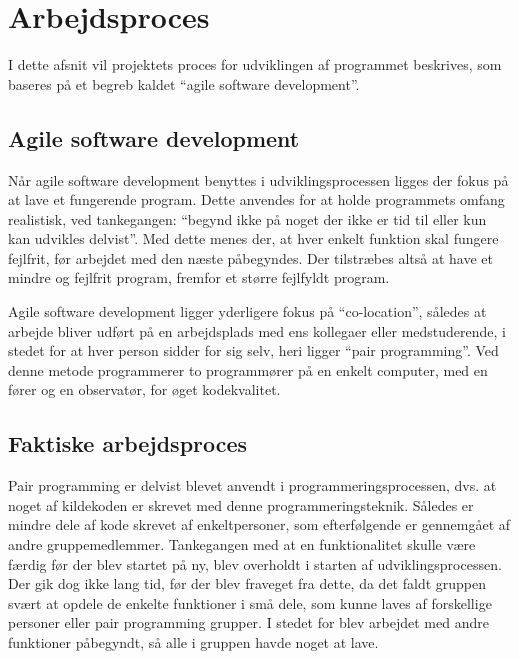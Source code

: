 \chapter{Arbejdsproces}\label{chap:arbejdsproces}

I dette afsnit vil projektets proces for udviklingen af programmet beskrives, som baseres på et begreb kaldet ``agile software development''.

\section{Agile software development}\label{sec:agile-software-development}
Når agile software development benyttes i udviklingsprocessen ligges der fokus på at lave et fungerende program.
Dette anvendes for at holde programmets omfang realistisk, ved tankegangen:
``begynd ikke på noget der ikke er tid til eller kun kan udvikles delvist''.
Med dette menes der, at hver enkelt funktion skal fungere fejlfrit, før arbejdet med den næste påbegyndes. 
Der tilstræbes altså at have et mindre og fejlfrit program, fremfor et større fejlfyldt program.

Agile software development ligger yderligere fokus på ``co-location'', således at arbejde bliver udført på en arbejdsplads med ens kollegaer eller medstuderende, i stedet for at hver person sidder for sig selv, heri ligger ``pair programming''. 
Ved denne metode programmerer to programmører på en enkelt computer, med en fører og en observatør, for øget kodekvalitet.\citep{agile_software}

\section{Faktiske arbejdsproces}\label{sec:faktiske-arbejdsproces}
Pair programming er delvist blevet anvendt i programmeringsprocessen, dvs. at noget af kildekoden er skrevet med denne programmeringsteknik.
Således er mindre dele af kode skrevet af enkeltpersoner, som efterfølgende er gennemgået af andre gruppemedlemmer.
Tankegangen med at en funktionalitet skulle være færdig før der blev startet på ny, blev overholdt i starten af udviklingsprocessen.
Der gik dog ikke lang tid, før der blev fraveget fra dette, da det faldt gruppen svært at opdele de enkelte funktioner i små dele, som kunne laves af forskellige personer eller pair programming grupper.
I stedet for blev arbejdet med andre funktioner påbegyndt, så alle i gruppen havde noget at lave.  
